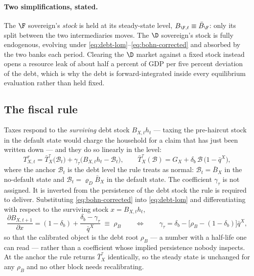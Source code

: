 \paragraph{Two simplifications, stated.} The $\F$ sovereign's \emph{stock} is
held at its steady-state level, $B_{\F,t}\equiv\bar B_\F$: only its split between
the two intermediaries moves. The $\D$ sovereign's stock is fully endogenous,
evolving under \eqref{eq:debt-lom}--\eqref{eq:bohn-corrected} and absorbed by the
two banks each period. Clearing the $\D$ market against a fixed stock instead
opens a resource leak of about half a percent of GDP per five percent deviation
of the debt, which is why the debt is forward-integrated inside every equilibrium
evaluation rather than held fixed.


\subsection{The fiscal rule}
\label{sec:fiscal-rule-corrected}

Taxes respond to the \emph{surviving} debt stock $B_{X,t}h_t$ --- taxing the
pre-haircut stock in the default state would charge the household for a claim
that has just been written down --- and they do so linearly in the level:
\begin{equation}
T^{\tau}_{X,t}
=\bar T^{\tau}_X\bigl(\mathcal{B}_t\bigr)
 +\gamma_\tau\bigl(B_{X,t}h_t-\mathcal{B}_t\bigr),
\qquad
\bar T^{\tau}_X(\mathcal{B})=G_X+\delta_b\,\mathcal{B}\,\bigl(1-\bar q^{X}\bigr),
\label{eq:bohn-corrected}
\end{equation}
where the anchor $\mathcal{B}_t$ is the debt level the rule treats as normal:
$\mathcal{B}_t=\bar B_X$ in the no-default state and $\mathcal{B}_t=\varrho_D\bar
B_X$ in the default state. The coefficient $\gamma_\tau$ is not assigned. It is
inverted from the persistence of the debt stock the rule is required to deliver.
Substituting \eqref{eq:bohn-corrected} into \eqref{eq:debt-lom} and
differentiating with respect to the surviving stock $x=B_{X,t}h_t$,
\begin{equation}
\frac{\partial B_{X,t+1}}{\partial x}
=(1-\delta_b)+\frac{\delta_b-\gamma_\tau}{\bar q^{X}}\;\equiv\;\rho_B
\qquad\Longleftrightarrow\qquad
\gamma_\tau=\delta_b-\bigl[\rho_B-(1-\delta_b)\bigr]\bar q^{X},
\label{eq:gamma-tau}
\end{equation}
so that the calibrated object is the debt root $\rho_B$ --- a number with a
half-life one can read --- rather than a coefficient whose implied persistence
nobody inspects. At the anchor the rule returns $\bar T^{\tau}_X$ identically, so
the steady state is unchanged for any $\rho_B$ and no other block needs
recalibrating.

